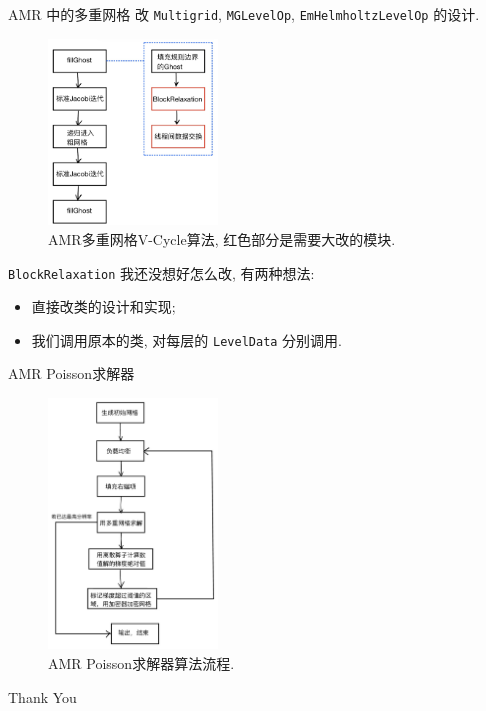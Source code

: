 \documentclass[10pt]{beamer}
\begin{document}
\begin{frame}[fragile]{AMR 中的多重网格}
    \footnotesize
    改 \verb|Multigrid|, \verb|MGLevelOp|, \verb|EmHelmholtzLevelOp| 的设计.

    \begin{figure}[H]
        \centering
        \includegraphics[width=0.4\textwidth]{jpg/amrvcycle.jpeg}
        \caption{\footnotesize AMR多重网格V-Cycle算法, 红色部分是需要大改的模块.}
    \end{figure}

    \pause
    \verb|BlockRelaxation| 我还没想好怎么改, 有两种想法:
    \begin{itemize}
        \item 直接改类的设计和实现;
        \item 我们调用原本的类, 对每层的 \verb|LevelData| 分别调用.
    \end{itemize}
\end{frame}

\begin{frame}[fragile]{AMR Poisson求解器}
    \footnotesize
    \begin{figure}[H]
        \centering
        \includegraphics[width=0.4\textwidth]{jpg/poissonsolver.jpeg}
        \caption{\footnotesize AMR Poisson求解器算法流程.}
    \end{figure}
\end{frame}

\begin{frame}
    \begin{center}
        {\Huge\calligra Thank You}
    \end{center}
\end{frame}
\end{document}

